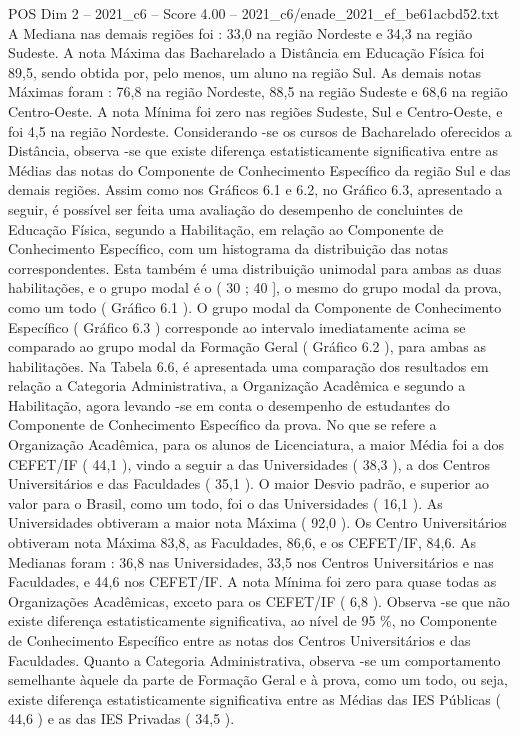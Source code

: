 \begin{textsample}{POS Dim 2 – 2021\_c6 – Score 4.00 – 2021\_c6/enade\_2021\_ef\_be61acbd52.txt}
A Mediana nas demais regiões foi : 33,0 na região Nordeste e 34,3 na região Sudeste.
A nota Máxima das Bacharelado a Distância em Educação Física foi 89,5, sendo obtida por, pelo menos, um aluno na região Sul.
As demais notas Máximas foram : 76,8 na região Nordeste, 88,5 na região Sudeste e 68,6 na região Centro-Oeste.
A nota Mínima foi zero nas regiões Sudeste, Sul e Centro-Oeste, e foi 4,5 na região Nordeste.
Considerando -se os cursos de Bacharelado oferecidos a Distância, observa -se que existe diferença estatisticamente significativa entre as Médias das notas do Componente de Conhecimento Específico da região Sul e das demais regiões.
Assim como nos Gráficos 6.1 e 6.2, no Gráfico 6.3, apresentado a seguir, é possível ser feita uma avaliação do desempenho de concluintes de Educação Física, segundo a Habilitação, em relação ao Componente de Conhecimento Específico, com um histograma da distribuição das notas correspondentes.
Esta também é uma distribuição unimodal para ambas as duas habilitações, e o grupo modal é o ( 30 ; 40 ], o mesmo do grupo modal da prova, como um todo ( Gráfico 6.1 ).
O grupo modal da Componente de Conhecimento Específico ( Gráfico 6.3 ) corresponde ao intervalo imediatamente acima se comparado ao grupo modal da Formação Geral ( Gráfico 6.2 ), para ambas as habilitações.
Na Tabela 6.6, é apresentada uma comparação dos resultados em relação a Categoria Administrativa, a Organização Acadêmica e segundo a Habilitação, agora levando -se em conta o desempenho de estudantes do Componente de Conhecimento Específico da prova.
No que se refere a Organização Acadêmica, para os alunos de Licenciatura, a maior Média foi a dos CEFET/IF ( 44,1 ), vindo a seguir a das Universidades ( 38,3 ), a dos Centros Universitários e das Faculdades ( 35,1 ).
O maior Desvio padrão, e superior ao valor para o Brasil, como um todo, foi o das Universidades ( 16,1 ).
As Universidades obtiveram a maior nota Máxima ( 92,0 ).
Os Centro Universitários obtiveram nota Máxima 83,8, as Faculdades, 86,6, e os CEFET/IF, 84,6.
As Medianas foram : 36,8 nas Universidades, 33,5 nos Centros Universitários e nas Faculdades, e 44,6 nos CEFET/IF.
A nota Mínima foi zero para quase todas as Organizações Acadêmicas, exceto para os CEFET/IF ( 6,8 ).
Observa -se que não existe diferença estatisticamente significativa, ao nível de 95 \%, no Componente de Conhecimento Específico entre as notas dos Centros Universitários e das Faculdades.
Quanto a Categoria Administrativa, observa -se um comportamento semelhante àquele da parte de Formação Geral e à prova, como um todo, ou seja, existe diferença estatisticamente significativa entre as Médias das IES Públicas ( 44,6 ) e as das IES Privadas ( 34,5 ).

\end{textsample}
